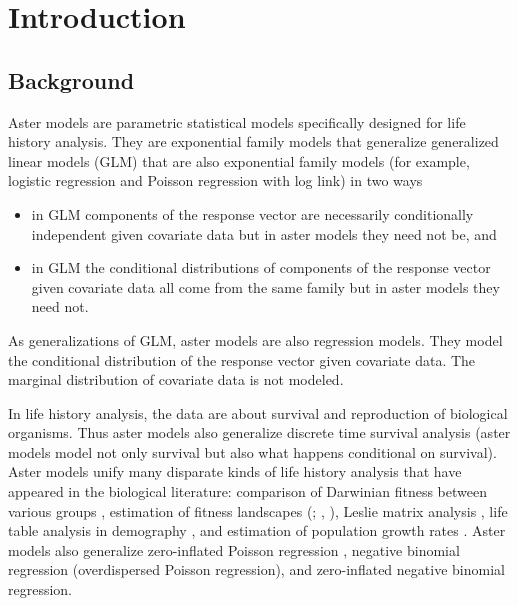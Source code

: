 
\chapter{Introduction}
\label{ch:introduction}

\section{Background}
\label{sec:background}

Aster models \citep*{aster1,aster2,reaster} 
are parametric statistical models
specifically designed for life history analysis.  They are exponential family
models that generalize generalized linear models (GLM) that are also
exponential family models (for example, logistic regression and
Poisson regression with log link) in two ways
\begin{itemize}
\item in GLM components of the response vector are
    necessarily conditionally independent given covariate data
    but in aster models they need not be, and
\item in GLM the conditional distributions of components of the
    response vector given covariate data all come from the same family
    but in aster models they need not.
\end{itemize}
As generalizations of GLM, aster models are also regression models.
They model the conditional distribution of the response vector given
covariate data.  The marginal distribution of covariate data is not
modeled.

In life history analysis, 
the data are about survival and reproduction
of biological organisms.  Thus aster models also generalize discrete time
survival analysis (aster models model not only survival but also
what happens conditional on survival).
Aster models unify many disparate kinds of life history analysis that have
appeared in the biological literature: comparison of Darwinian fitness between
various groups \citep{aster1,aster2}, estimation of fitness landscapes
(\citealp{lande-arnold}; \citealp{aster2,aster3}, \citealp*{aster-hornworm}),
Leslie matrix analysis
\citep{caswell}, life table analysis in demography \citep{goodman},
and estimation of population growth rates
\citep{fisher,lenski-service,aster2,aster-hornworm}.
Aster models also generalize zero-inflated Poisson regression \citep{lambert},
negative binomial regression (overdispersed Poisson regression),
and zero-inflated negative binomial regression.


